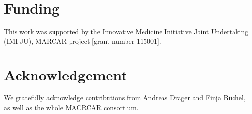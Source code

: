 \documentclass{bioinfo}
\begin{document}


\section*{Funding}
This work was supported by the Innovative Medicine Initiative Joint Undertaking (IMI JU), MARCAR project [grant number 115001].

\section*{Acknowledgement}
We gratefully acknowledge contributions from Andreas Dr\"ager and Finja B\"uchel, as well as the
whole MACRCAR consortium.



%
%
%
%
%


\end{document}
